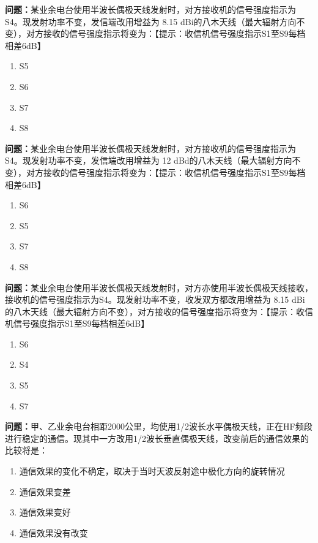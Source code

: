 \bigskip


\noindent\textbf{问题：}某业余电台使用半波长偶极天线发射时，对方接收机的信号强度指示为S4。现发射功率不变，发信端改用增益为 8.15 dBi的八木天线（最大辐射方向不变），对方接收的信号强度指示将变为：【提示：收信机信号强度指示S1至S9每档相差6dB】
\begin{enumerate}[label=\Alph*), leftmargin=3em]
\item S5
\item S6
\item S7
\item S8
\end{enumerate}

\bigskip


\noindent\textbf{问题：}某业余电台使用半波长偶极天线发射时，对方接收机的信号强度指示为S4。现发射功率不变，发信端改用增益为 12 dBd的八木天线（最大辐射方向不变），对方接收的信号强度指示将变为：【提示：收信机信号强度指示S1至S9每档相差6dB】
\begin{enumerate}[label=\Alph*), leftmargin=3em]
\item S6
\item S5
\item S7
\item S8
\end{enumerate}

\bigskip


\noindent\textbf{问题：}某业余电台使用半波长偶极天线发射时，对方亦使用半波长偶极天线接收，接收机的信号强度指示为S4。现发射功率不变，收发双方都改用增益为 8.15 dBi的八木天线（最大辐射方向不变），对方接收的信号强度指示将变为：【提示：收信机信号强度指示S1至S9每档相差6dB】
\begin{enumerate}[label=\Alph*), leftmargin=3em]
\item S6
\item S4
\item S5
\item S7
\end{enumerate}

\bigskip


\noindent\textbf{问题：}甲、乙业余电台相距2000公里，均使用1/2波长水平偶极天线，正在HF频段进行稳定的通信。现其中一方改用1/2波长垂直偶极天线，改变前后的通信效果的比较将是：
\begin{enumerate}[label=\Alph*), leftmargin=3em]
\item 通信效果的变化不确定，取决于当时天波反射途中极化方向的旋转情况
\item 通信效果变差
\item 通信效果变好
\item 通信效果没有改变
\end{enumerate}

